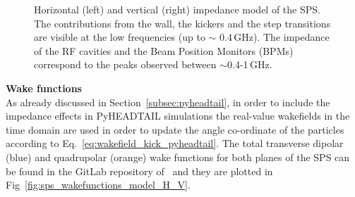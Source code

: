 \begin{figure}[!ht]
\begin{subfigure}[t]{0.45\textwidth}
    \end{subfigure}
    \hfill
     \caption{Horizontal (left) and vertical (right) impedance model of the SPS. The contributions from the wall, the kickers and the step transitions are visible at the low frequencies (up to $\sim$ 0.4\,GHz). The impedance of the RF cavities and the Beam Position Monitors (BPMs) correspond to the peaks observed between $\sim$0.4-1\,GHz.}
     
     \label{fig:sps_impedance_model_H_V}
 \end{figure}



\normalsize{\textbf{Wake functions}}\\
As already discussed in Section~\ref{subsec:pyheadtail}, in order to include the impedance effects in PyHEADTAIL simulations the real-value wakefields in the time domain are used in order to update the angle co-ordinate of the particles according to Eq.~\eqref{eq:wakefield_kick_pyheadtail}.
The total transverse dipolar (blue) and quadrupolar (orange) wake functions for both planes of the SPS can be found in the GitLab repository of~\cite{sps_impedance_model_git} and they are plotted in Fig~\ref{fig:sps_wakefunctions_model_H_V}.


